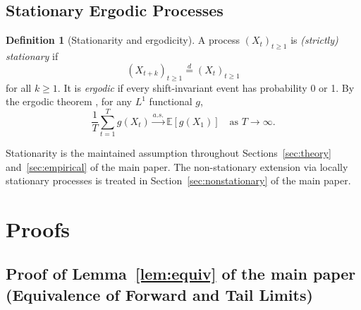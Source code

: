 \documentclass[bj,authoryear]{imsart}
\theoremstyle{plain}
\theoremstyle{definition}
\newtheorem{definition}[theorem]{Definition}
\newcommand{\E}{\mathbb{E}}
\begin{document}
\subsection{Stationary Ergodic Processes}

\begin{definition}[Stationarity and ergodicity]
\label{def:ergodic}
  A process $(X_t)_{t\geq 1}$ is \emph{(strictly) stationary} if
  $$(X_{t+k})_{t\geq 1} \overset{d}{=} (X_t)_{t\geq 1}$$ for all $k \geq 1$.
  It is \emph{ergodic} if every shift-invariant event has probability 0 or 1.
  By the ergodic theorem \citep{walters2000introduction}, for any $L^1$
  functional $g$,
  \[
    \frac{1}{T}\sum_{t=1}^T g(X_t) \xrightarrow{a.s.} \E[g(X_1)]
    \quad \text{as } T\to\infty.
  \]
\end{definition}

Stationarity is the maintained assumption throughout Sections~\ref{sec:theory} and~\ref{sec:empirical} of the main paper.  The non-stationary extension via locally stationary
processes \citep{dahlhaus1997fitting} is treated in
Section~\ref{sec:nonstationary} of the main paper.

\section{Proofs}
\label{app:proofs}

\subsection{Proof of Lemma~\ref{lem:equiv} of the main paper (Equivalence of Forward and Tail Limits)}
\label{app:proof-lemequiv}
\end{document}
